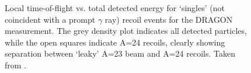 \begin{figure}
\caption{Local time-of-flight vs. total detected energy for `singles' (not coincident with a prompt $\gamma$ ray) recoil events for the DRAGON  measurement. The grey density plot indicates all detected particles, while the open squares indicate A=24 recoils, clearly showing separation between `leaky' A=23 beam and A=24 recoils. Taken from \cite{eri10}.}
\label{fig:Mg23_tof_IC}
\end{figure}

